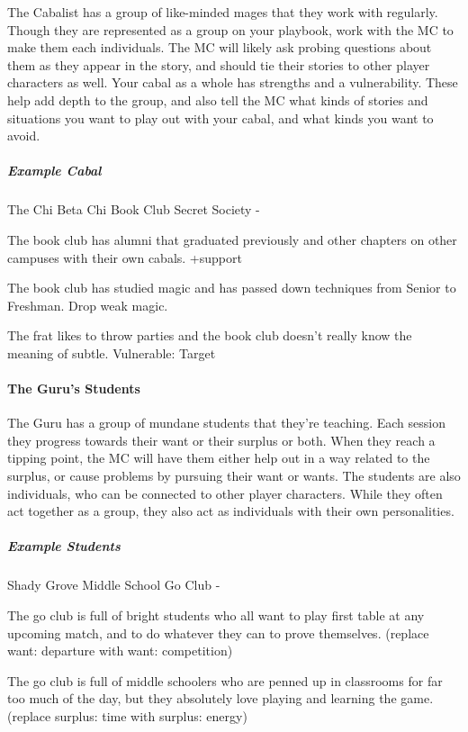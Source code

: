 \documentclass[
]{article}
\begin{document}
The Cabalist has a group of like-minded mages that they work with
regularly. Though they are represented as a group on your playbook, work
with the MC to make them each individuals. The MC will likely ask
probing questions about them as they appear in the story, and should tie
their stories to other player characters as well. Your cabal as a whole
has strengths and a vulnerability. These help add depth to the group,
and also tell the MC what kinds of stories and situations you want to
play out with your cabal, and what kinds you want to avoid.

\hypertarget{example-cabal}{%
\subparagraph{Example Cabal}\label{example-cabal}}

The Chi Beta Chi Book Club Secret Society -

The book club has alumni that graduated previously and other chapters on
other campuses with their own cabals. +support

The book club has studied magic and has passed down techniques from
Senior to Freshman. Drop weak magic.

The frat likes to throw parties and the book club doesn't really know
the meaning of subtle. Vulnerable: Target

\hypertarget{the-gurus-students}{%
\paragraph{The Guru's Students}\label{the-gurus-students}}

The Guru has a group of mundane students that they're teaching. Each
session they progress towards their want or their surplus or both. When
they reach a tipping point, the MC will have them either help out in a
way related to the surplus, or cause problems by pursuing their want or
wants. The students are also individuals, who can be connected to other
player characters. While they often act together as a group, they also
act as individuals with their own personalities.

\hypertarget{example-students}{%
\subparagraph{Example Students}\label{example-students}}

Shady Grove Middle School Go Club -

The go club is full of bright students who all want to play first table
at any upcoming match, and to do whatever they can to prove themselves.
(replace want: departure with want: competition)

The go club is full of middle schoolers who are penned up in classrooms
for far too much of the day, but they absolutely love playing and
learning the game. (replace surplus: time with surplus: energy)
\end{document}
